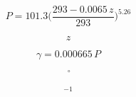 \documentclass[preview,border=2pt]{standalone}
\begin{document}
\[
P=101.3\Big(\dfrac{293-0.0065\,z}{293}\Big)^{5.26}
\]

\[
z
\]

\[
\gamma=0.000665\,P
\]

\[
\,^{\circ}\!
\]

\[
^{-1}
\]
\end{document}
